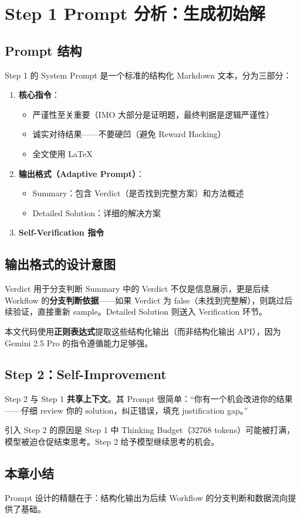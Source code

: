 \section{Step 1 Prompt 分析：生成初始解}

\subsection{Prompt 结构}

Step 1 的 System Prompt 是一个标准的结构化 Markdown 文本，分为三部分：

\begin{enumerate}
    \item \textbf{核心指令}：
    \begin{itemize}
        \item 严谨性至关重要（IMO 大部分是证明题，最终判据是逻辑严谨性）
        \item 诚实对待结果——不要硬凹（避免 Reward Hacking）
        \item 全文使用 LaTeX
    \end{itemize}
    \item \textbf{输出格式（Adaptive Prompt）}：
    \begin{itemize}
        \item Summary：包含 Verdict（是否找到完整方案）和方法概述
        \item Detailed Solution：详细的解决方案
    \end{itemize}
    \item \textbf{Self-Verification 指令}
\end{enumerate}

\subsection{输出格式的设计意图}

\begin{importantbox}{Verdict 用于分支判断}
Summary 中的 Verdict 不仅是信息展示，更是后续 Workflow 的\textbf{分支判断依据}——如果 Verdict 为 false（未找到完整解），则跳过后续验证，直接重新 sample。Detailed Solution 则送入 Verification 环节。
\end{importantbox}

本文代码使用\textbf{正则表达式}提取这些结构化输出（而非结构化输出 API），因为 Gemini 2.5 Pro 的指令遵循能力足够强。

\subsection{Step 2：Self-Improvement}

Step 2 与 Step 1 \textbf{共享上下文}。其 Prompt 很简单：``你有一个机会改进你的结果——仔细 review 你的 solution，纠正错误，填充 justification gap。''

引入 Step 2 的原因是 Step 1 中 Thinking Budget（32768 tokens）可能被打满，模型被迫仓促结束思考。Step 2 给予模型继续思考的机会。

\subsection{本章小结}

Prompt 设计的精髓在于：结构化输出为后续 Workflow 的分支判断和数据流向提供了基础。

